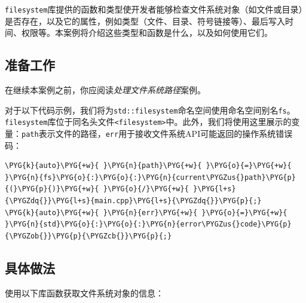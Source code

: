 
\texttt{filesystem}库提供的函数和类型使开发者能够检查文件系统对象（如文件或目录）是否存在，以及它的属性，例如类型（文件、目录、符号链接等）、最后写入时间、权限等。本案例将介绍这些类型和函数是什么，以及如何使用它们。



\subsection{准备工作}



在继续本案例之前，你应阅读\textit{处理文件系统路径}案例。



对于以下代码示例，我们将为\texttt{std::\allowbreak{}filesystem}命名空间使用命名空间别名\texttt{fs}。\texttt{filesystem}库位于同名头文件\texttt{<\allowbreak{}filesystem>}中。此外，我们将使用这里展示的变量：\texttt{path}表示文件的路径，\texttt{err}用于接收文件系统API可能返回的操作系统错误码：



\begin{codeblockbg}
\begin{Verbatim}[commandchars=\\\{\},breaklines=true,breakanywhere=true,fontsize=\codefont,xleftmargin=17bp]
\PYG{k}{auto}\PYG{+w}{ }\PYG{n}{path}\PYG{+w}{ }\PYG{o}{=}\PYG{+w}{ }\PYG{n}{fs}\PYG{o}{:}\PYG{o}{:}\PYG{n}{current\PYGZus{}path}\PYG{p}{(}\PYG{p}{)}\PYG{+w}{ }\PYG{o}{/}\PYG{+w}{ }\PYG{l+s}{\PYGZdq{}}\PYG{l+s}{main.cpp}\PYG{l+s}{\PYGZdq{}}\PYG{p}{;}
\PYG{k}{auto}\PYG{+w}{ }\PYG{n}{err}\PYG{+w}{ }\PYG{o}{=}\PYG{+w}{ }\PYG{n}{std}\PYG{o}{:}\PYG{o}{:}\PYG{n}{error\PYGZus{}code}\PYG{p}{\PYGZob{}}\PYG{p}{\PYGZcb{}}\PYG{p}{;}
\end{Verbatim}
\end{codeblockbg}



\subsection{具体做法}



使用以下库函数获取文件系统对象的信息：




